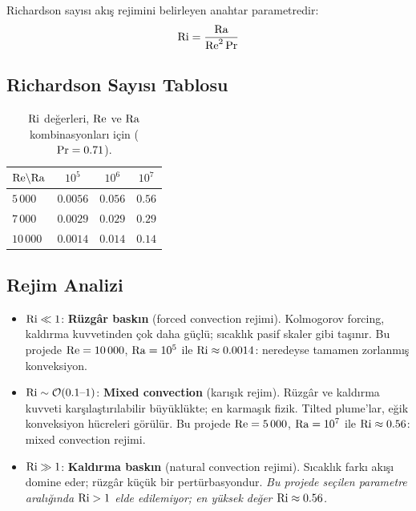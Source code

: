 Richardson sayısı akış rejimini belirleyen anahtar parametredir:
\begin{equation}
    \mathrm{Ri} = \frac{\mathrm{Ra}}{\mathrm{Re}^2 \, \mathrm{Pr}}
    \label{eq:Ri_definition}
\end{equation}

\subsection{Richardson Sayısı Tablosu}

\begin{table}[H]
\centering
\caption{$\mathrm{Ri}$ değerleri, $\mathrm{Re}$ ve $\mathrm{Ra}$ kombinasyonları için ($\mathrm{Pr} = 0.71$).}
\label{tab:Ri_values}
\begin{tabular}{@{}l|ccc@{}}
\toprule
$\mathrm{Re} \backslash \mathrm{Ra}$ & $10^5$ & $10^6$ & $10^7$ \\
\midrule
$5\,000$   & $0.0056$   & $0.056$   & $0.56$     \\
$7\,000$   & $0.0029$   & $0.029$   & $0.29$     \\
$10\,000$  & $0.0014$   & $0.014$   & $0.14$     \\
\bottomrule
\end{tabular}
\end{table}

\subsection{Rejim Analizi}

\begin{itemize}
    \item $\mathrm{Ri} \ll 1$: \textbf{Rüzgâr baskın} (forced convection rejimi). Kolmogorov forcing, kaldırma kuvvetinden çok daha güçlü; sıcaklık pasif skaler gibi taşınır. Bu projede $\mathrm{Re} = 10\,000$, $\mathrm{Ra} = 10^5$ ile $\mathrm{Ri} \approx 0.0014$: neredeyse tamamen zorlanmış konveksiyon.

    \item $\mathrm{Ri} \sim \mathcal{O}(0.1\text{--}1)$: \textbf{Mixed convection} (karışık rejim). Rüzgâr ve kaldırma kuvveti karşılaştırılabilir büyüklükte; en karmaşık fizik. Tilted plume'lar, eğik konveksiyon hücreleri görülür. Bu projede $\mathrm{Re} = 5\,000$, $\mathrm{Ra} = 10^7$ ile $\mathrm{Ri} \approx 0.56$: mixed convection rejimi.

    \item $\mathrm{Ri} \gg 1$: \textbf{Kaldırma baskın} (natural convection rejimi). Sıcaklık farkı akışı domine eder; rüzgâr küçük bir pertürbasyondur. \textit{Bu projede seçilen parametre aralığında $\mathrm{Ri} > 1$ elde edilemiyor; en yüksek değer $\mathrm{Ri} \approx 0.56$.}
\end{itemize}

